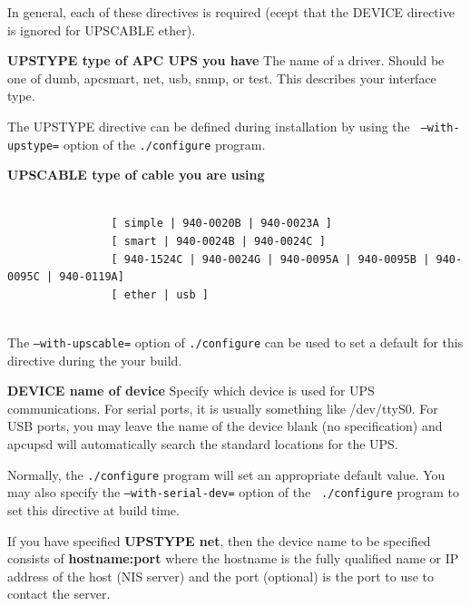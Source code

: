 \label{index-Directives_002c-General-239}
\label{index-General-Directives-240}
In general, each of these directives is required (ecept that the DEVICE
directive is ignored for UPSCABLE ether).  

\begin{description}

\item {\bf UPSTYPE \lt{}type of APC UPS you have\gt{}}
The name of a driver.  Should be one of dumb, apcsmart, net, usb, snmp, or
test. This describes your interface type.  

The UPSTYPE directive can be defined during installation by using the {\tt
--with-upstype=} option of the {\tt ./configure} program.  

\item {\bf UPSCABLE \lt{}type of cable you are using\gt{}\gt{}}

\footnotesize
\begin{verbatim}
          
                [ simple | 940-0020B | 940-0023A ]
                [ smart | 940-0024B | 940-0024C ]
                [ 940-1524C | 940-0024G | 940-0095A | 940-0095B | 940-0095C | 940-0119A]
                [ ether | usb ]
     
\end{verbatim}
\normalsize

The {\tt --with-upscable=} option of {\tt ./configure} can be used to set a
default for this directive during the your build.  

\item {\bf DEVICE \lt{}name of device\gt{}}
Specify which device is used for UPS communications. For serial ports, it is
usually something like /dev/ttyS0. For USB ports, you may leave the name of
the device blank (no specification) and apcupsd will automatically search the
standard locations for the UPS.  

Normally, the {\tt ./configure} program will set an appropriate default value.
You may also specify the {\tt --with-serial-dev=} option of the {\tt
./configure} program to set this directive at build time.  

If you have specified {\bf UPSTYPE net}, then the device name to be specified
consists of {\bf hostname:port} where the hostname is the fully qualified name
or IP address of the host (NIS server) and the port (optional) is the port to
use to contact the server.  


\end{description}
